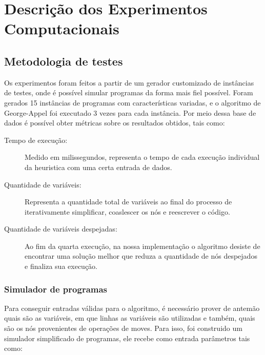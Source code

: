 \section{Descrição dos Experimentos Computacionais}

\subsection{Metodologia de testes}

Os experimentos foram feitos a partir de um gerador customizado de instâncias de testes, onde 
é possível simular programas da forma mais fiel possível. Foram gerados 15 instâncias de programas 
com características variadas, e o algoritmo de George-Appel foi executado 3 vezes para cada instância.
Por meio dessa base de dados é possível obter métricas sobre os resultados obtidos, tais como:


\begin{description}
  \item[Tempo de execução:] Medido em milissegundos, representa o tempo de cada execução individual da heuristica com uma certa entrada de dados.
  \item[Quantidade de variáveis:] Representa a quantidade total de variáveis ao final do processo de iterativamente simplificar, coaslescer os nós 
    e reescrever o código.
  \item[Quantidade de variáveis despejadas:] Ao fim da quarta execução, na nossa implementação o algoritmo desiste de encontrar uma solução melhor que reduza a 
    quantidade de nós despejados e finaliza sua execução.
\end{description}


\subsubsection{Simulador de programas}

Para conseguir entradas válidas para o algoritmo, é necessário prover de antemão quais são as variáveis, em que linhas as variáveis são utilizadas e também,
quais são os nós provenientes de operações de moves. Para isso, foi construido um simulador simplificado de programas, ele recebe como entrada parâmetros tais como:


